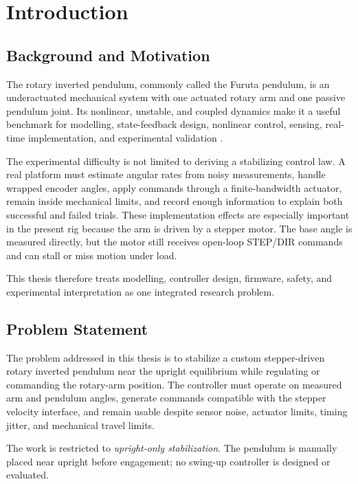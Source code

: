 \chapter{Introduction}
\label{ch:introduction}

\section{Background and Motivation}
The rotary inverted pendulum, commonly called the Furuta pendulum, is an
underactuated mechanical system with one actuated rotary arm and one passive
pendulum joint. Its nonlinear, unstable, and coupled dynamics make it a useful
benchmark for modelling, state-feedback design, nonlinear control, sensing,
real-time implementation, and experimental validation
\cite{Furuta1991,Hamza2019}.

The experimental difficulty is not limited to deriving a stabilizing control
law. A real platform must estimate angular rates from noisy measurements,
handle wrapped encoder angles, apply commands through a finite-bandwidth
actuator, remain inside mechanical limits, and record enough information to
explain both successful and failed trials. These implementation effects are
especially important in the present rig because the arm is driven by a stepper
motor. The base angle is measured directly, but the motor still receives
open-loop STEP/DIR commands and can stall or miss motion under load.

This thesis therefore treats modelling, controller design, firmware, safety,
and experimental interpretation as one integrated research problem.

\section{Problem Statement}
The problem addressed in this thesis is to stabilize a custom stepper-driven
rotary inverted pendulum near the upright equilibrium while regulating or
commanding the rotary-arm position. The controller must operate on measured
arm and pendulum angles, generate commands compatible with the stepper
velocity interface, and remain usable despite sensor noise, actuator limits,
timing jitter, and mechanical travel limits.

The work is restricted to \emph{upright-only stabilization}. The pendulum is
manually placed near upright before engagement; no swing-up controller is
designed or evaluated.

